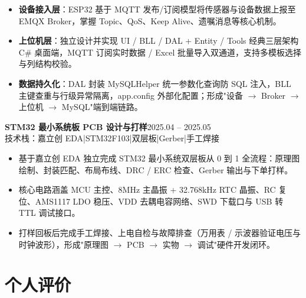 \documentclass[10pt,a4paper]{article}
\newcommand{\projectblock}[3]{%
    {\bfseries\color{darktext}#1}\hfill{\color{graytext}#2}\\%
    {\small\color{graytext}#3}%
    \vspace{0.2em}%
}
\begin{document}
\begin{itemize}[leftmargin=1.5em, itemsep=2pt, parsep=0pt, topsep=2pt]
    \item \textbf{设备接入层}：ESP32 基于 MQTT 发布/订阅模型将传感器与设备数据上报至 EMQX Broker，掌握 Topic、QoS、Keep Alive、遗嘱消息等核心机制。
    \item \textbf{上位机层}：独立设计并实现 UI / BLL / DAL + Entity / Tools 经典三层架构 C\# 桌面端，MQTT 订阅实时数据 / Excel 批量导入双通道，支持多模板选择与列结构校验。
    \item \textbf{数据持久化}：DAL 封装 MySQLHelper 统一参数化查询防 SQL 注入，BLL 主键查重与行级异常隔离，app.config 外部化配置；形成"设备 $\to$ Broker $\to$ 上位机 $\to$ MySQL"端到端链路。
\end{itemize}

\vspace{0.15em}

\projectblock{STM32 最小系统板 PCB 设计与打样}{2025.04 -- 2025.05}{技术栈：嘉立创 EDA\hspace{0.3em}|\hspace{0.3em}STM32F103\hspace{0.3em}|\hspace{0.3em}双层板\hspace{0.3em}|\hspace{0.3em}Gerber\hspace{0.3em}|\hspace{0.3em}手工焊接}

\begin{itemize}[leftmargin=1.5em, itemsep=2pt, parsep=0pt, topsep=2pt]
    \item 基于嘉立创 EDA 独立完成 STM32 最小系统双层板从 0 到 1 全流程：原理图绘制、封装匹配、布局布线、DRC / ERC 检查、Gerber 输出与下单打样。
    \item 核心电路涵盖 MCU 主控、8MHz 主晶振 + 32.768kHz RTC 晶振、RC 复位、AMS1117 LDO 稳压、VDD 去耦电容网络、SWD 下载口与 USB 转 TTL 调试接口。
    \item 打样回板后完成手工焊接、上电自检与故障排查（万用表 / 示波器验证电压与时钟波形），形成"原理图 $\to$ PCB $\to$ 实物 $\to$ 调试"硬件开发闭环。
\end{itemize}

\vspace{0.15em}

\section{\faUser\hspace{0.4em}个人评价}
\end{document}
